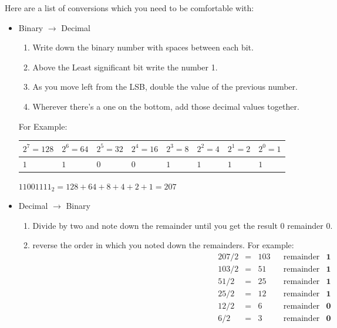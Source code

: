   Here are a list of conversions which you need to be comfortable with:
  \begin{itemize}
    \setlength{\itemsep}{0em}
    \item Binary $ \to $ Decimal
      \begin{enumerate}
        \setlength{\itemsep}{0em}
        \item Write down the binary number with spaces between each bit.
        \item Above the Least significant bit write the number 1.
        \item As you move left from the LSB, double the value of the previous number.
        \item Wherever there's a one on the bottom, add those decimal values together.
      \end{enumerate}
      \subitem For Example:
      \begin{table}[h]
        \centering
        \begin{tabular}{ C{1cm} C{1cm} C{1cm} C{1cm} C{1cm} C{1cm} C{1cm} C{1cm} }
        $ 2^7 = 128 $ & $ 2^6 = 64 $ & $ 2^5 = 32 $ & $ 2^4 = 16 $ & $ 2^3 = 8 $ & $ 2^2 = 4 $ & $ 2^1 = 2 $ & $ 2^0 = 1 $ \\
        \hline
        $ 1 $ & $ 1 $ & $ 0 $ & $ 0 $ & $ 1 $ & $ 1 $ & $ 1 $ & $ 1 $ \\
        \end{tabular}
      \end{table}
      \subitem $ 11001111_2 = 128 + 64 + 8 + 4 + 2 + 1 = 207 $
    \item Decimal $ \to $ Binary
      \begin{enumerate}
        \item Divide by two and note down the remainder until you get the result 0 remainder 0.
        \item reverse the order in which you noted down the remainders. For example:
        \begin{align*}
          & 207/2 & = & 103 & & \textrm{remainder} & \textbf{1}\\
          & 103/2 & = & 51 & & \textrm{remainder} & \textbf{1}\\
          & 51/2 & = & 25 & & \textrm{remainder} & \textbf{1}\\
          & 25/2 & = & 12 & & \textrm{remainder} & \textbf{1}\\
          & 12/2 & = & 6 & & \textrm{remainder} & \textbf{0} \\
          & 6/2 & = & 3 & & \textrm{remainder} & \textbf{0} \\

\end{align*}
\end{enumerate}
\end{itemize}
